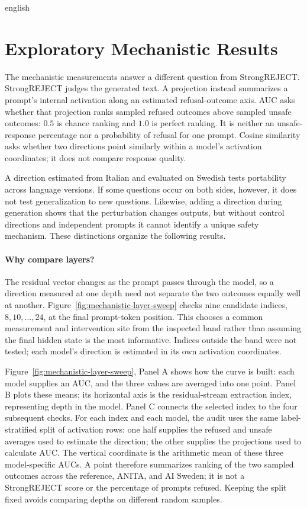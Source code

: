 \begin{otherlanguage*}{english}
\section{Exploratory Mechanistic Results}
\label{sec:mechanistic-results}
\setcounter{secnumdepth}{3}

The mechanistic measurements answer a different question from StrongREJECT. StrongREJECT judges the generated text. A projection instead summarizes a prompt's internal activation along an estimated refusal-outcome axis. AUC asks whether that projection ranks sampled refused outcomes above sampled unsafe outcomes: $0.5$ is chance ranking and $1.0$ is perfect ranking. It is neither an unsafe-response percentage nor a probability of refusal for one prompt. Cosine similarity asks whether two directions point similarly within a model's activation coordinates; it does not compare response quality.

A direction estimated from Italian and evaluated on Swedish tests portability across language versions. If some questions occur on both sides, however, it does not test generalization to new questions. Likewise, adding a direction during generation shows that the perturbation changes outputs, but without control directions and independent prompts it cannot identify a unique safety mechanism. These distinctions organize the following results.

\paragraph*{Why compare layers?} The residual vector changes as the prompt passes through the model, so a direction measured at one depth need not separate the two outcomes equally well at another. Figure~\ref{fig:mechanistic-layer-sweep} checks nine candidate indices, $8,10,\ldots,24$, at the final prompt-token position. This chooses a common measurement and intervention site from the inspected band rather than assuming the final hidden state is the most informative. Indices outside the band were not tested; each model's direction is estimated in its own activation coordinates.

Figure~\ref{fig:mechanistic-layer-sweep}, Panel A shows how the curve is built: each model supplies an AUC, and the three values are averaged into one point. Panel B plots these means; its horizontal axis is the residual-stream extraction index, representing depth in the model. Panel C connects the selected index to the four subsequent checks. For each index and each model, the audit uses the same label-stratified split of activation rows: one half supplies the refused and unsafe averages used to estimate the direction; the other supplies the projections used to calculate AUC. The vertical coordinate is the arithmetic mean of these three model-specific AUCs. A point therefore summarizes ranking of the two sampled outcomes across the reference, ANITA, and AI Sweden; it is not a StrongREJECT score or the percentage of prompts refused. Keeping the split fixed avoids comparing depths on different random samples.


\end{otherlanguage*}
